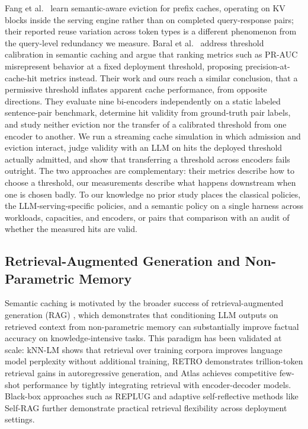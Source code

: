 \documentclass[sigconf,nonacm]{acmart}
\begin{document}
Fang et al.\ \cite{fang2026prefix} learn semantic-aware eviction for prefix
caches, operating on KV blocks inside the serving engine rather than on
completed query-response pairs; their reported reuse variation across token
types is a different phenomenon from the query-level redundancy we measure.
Baral et al.\ \cite{baral2026calibration} address threshold calibration in
semantic caching and argue that ranking metrics such as PR-AUC misrepresent
behavior at a fixed deployment threshold, proposing precision-at-cache-hit
metrics instead. Their work and ours reach a similar conclusion, that a
permissive threshold inflates apparent cache performance, from opposite
directions. They evaluate nine bi-encoders independently on a static labeled
sentence-pair benchmark, determine hit validity from ground-truth pair
labels, and study neither eviction nor the transfer of a calibrated
threshold from one encoder to another. We run a streaming cache simulation
in which admission and eviction interact, judge validity with an LLM on
hits the deployed threshold actually admitted, and show that transferring a
threshold across encoders fails outright. The two approaches are
complementary: their metrics describe how to choose a threshold, our
measurements describe what happens downstream when one is chosen badly. To our knowledge no prior study places the
classical policies, the LLM-serving-specific policies, and a semantic policy
on a single harness across workloads, capacities, and encoders, or pairs
that comparison with an audit of whether the measured hits are valid.

\subsection{Retrieval-Augmented Generation and Non-Parametric Memory}
Semantic caching is motivated by the broader success of retrieval-augmented generation (RAG) \cite{lewis2020rag}, which demonstrates that conditioning LLM outputs on retrieved context from non-parametric memory can substantially improve factual accuracy on knowledge-intensive tasks. This paradigm has been validated at scale: kNN-LM \cite{khandelwal2020knnlm} shows that retrieval over training corpora improves language model perplexity without additional training, RETRO \cite{borgeaud2022retro} demonstrates trillion-token retrieval gains in autoregressive generation, and Atlas \cite{izacard2023atlas} achieves competitive few-shot performance by tightly integrating retrieval with encoder-decoder models. Black-box approaches such as REPLUG \cite{shi2023replug} and adaptive self-reflective methods like Self-RAG \cite{asai2024selfrag} further demonstrate practical retrieval flexibility across deployment settings.
\end{document}
